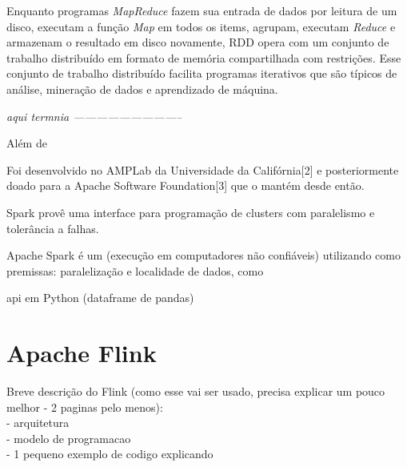 
Enquanto programas \emph{MapReduce} fazem sua entrada de dados por leitura de um
disco, executam a função \emph{Map} em todos os items, agrupam, executam
\emph{Reduce} e armazenam o resultado em disco novamente, RDD opera com um
conjunto de trabalho distribuído em formato de memória compartilhada com
restrições. Esse conjunto de trabalho distribuído facilita programas iterativos
que são típicos de análise, mineração de dados e aprendizado de máquina.

\textit{aqui termnia -----------------------------}

Além de 

Foi desenvolvido no AMPLab da Universidade da Califórnia[2] e posteriormente
doado para a Apache Software Foundation[3] que o mantém desde então.

Spark provê uma interface para programação de clusters com paralelismo e
tolerância a falhas.

Apache Spark \cite{Zaharia} é um 
(execução em computadores não confiáveis) utilizando como premissas: paralelização
e localidade de dados, como 


api em Python (dataframe de pandas)


\section{Apache Flink}

Breve descrição do Flink (como esse vai ser usado, precisa explicar um pouco melhor - 2 paginas pelo menos):\\
- arquitetura\\
- modelo de programacao\\
- 1 pequeno exemplo de codigo explicando

\cite{Lopez2018}


